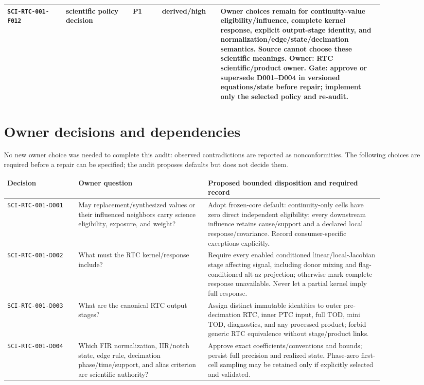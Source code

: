 \documentclass[11pt]{article}
\newcommand{\code}[1]{\nolinkurl{#1}}
\begin{document}
\begin{longtable}{@{}L{0.14\linewidth}L{0.16\linewidth}L{0.07\linewidth}L{0.14\linewidth}L{0.39\linewidth}@{}}
\code{SCI-RTC-001-F012} & scientific policy decision & P1 & derived/high & Owner choices remain for continuity-value eligibility/influence, complete kernel response, explicit output-stage identity, and normalization/edge/state/decimation semantics. Source cannot choose these scientific meanings. Owner: RTC scientific/product owner. Gate: approve or supersede D001--D004 in versioned equations/state before repair; implement only the selected policy and re-audit. \\
\bottomrule
\end{longtable}

\section{Owner decisions and dependencies}

No new owner choice was needed to complete this audit: observed contradictions
are reported as nonconformities.  The following choices are required before a
repair can be specified; the audit proposes defaults but does not decide them.

\begin{longtable}{@{}L{0.17\linewidth}L{0.31\linewidth}L{0.42\linewidth}@{}}
\toprule
Decision & Owner question & Proposed bounded disposition and required record \\
\midrule
\endhead
\code{SCI-RTC-001-D001} & May replacement/synthesized values or their influenced neighbors carry science eligibility, exposure, and weight? & Adopt frozen-core default: continuity-only cells have zero direct independent eligibility; every downstream influence retains cause/support and a declared local response/covariance. Record consumer-specific exceptions explicitly. \\
\code{SCI-RTC-001-D002} & What must the RTC kernel/response include? & Require every enabled conditioned linear/local-Jacobian stage affecting signal, including donor mixing and flag-conditioned alt-az projection; otherwise mark complete response unavailable. Never let a partial kernel imply full response. \\
\code{SCI-RTC-001-D003} & What are the canonical RTC output stages? & Assign distinct immutable identities to outer pre-decimation RTC, inner PTC input, full TOD, mini TOD, diagnostics, and any processed product; forbid generic RTC equivalence without stage/product links. \\
\code{SCI-RTC-001-D004} & Which FIR normalization, IIR/notch state, edge rule, decimation phase/time/support, and alias criterion are scientific authority? & Approve exact coefficients/conventions and bounds; persist full precision and realized state.  Phase-zero first-cell sampling may be retained only if explicitly selected and validated. \\
\bottomrule
\end{longtable}
\end{document}
